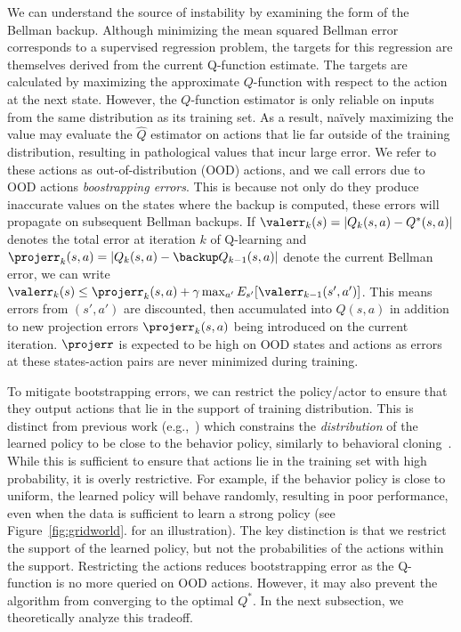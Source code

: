 We can understand the source of instability by examining the form of the Bellman backup. Although minimizing the mean squared Bellman error corresponds to a supervised regression problem, the targets for this regression are themselves derived from the current Q-function estimate. The targets are calculated by maximizing the approximate $Q$-function with respect to the action at the next state. However, the $Q$-function estimator is only reliable on inputs from the same distribution as its training set. As a result, na\"{i}vely maximizing the value may evaluate the $\hat{Q}$ estimator on actions that lie far outside of the training distribution, resulting in pathological values that incur large error. We refer to these actions as out-of-distribution (OOD) actions, and we call errors due to OOD actions \textit{boostrapping errors}. This is because not only do they produce inaccurate values on the states where the backup is computed, these errors will propagate on subsequent Bellman backups. 
If $\valerr_k(s) = |Q_k(s,a) - Q^*(s,a)|$ denotes the total error at iteration $k$ of Q-learning and $\projerr_k(s, a) = |Q_k(s,a) - \backup Q_{k-1}(s,a)|$ denote the current Bellman error, we can write $\valerr_k(s) \le \projerr_k(s,a) + \gamma \max_{a'} E_{s'}[\valerr_{k-1}(s',a')]$. This means errors from $(s', a')$ are discounted, then accumulated into $Q(s,a)$ in addition to new projection errors $\projerr_k(s, a)$ being introduced on the current iteration. $\projerr$ is expected to be high on OOD states and actions
as errors at these states-action pairs are never minimized during training.

To mitigate bootstrapping errors, we can restrict the policy/actor to ensure that they output actions that lie in the support of training distribution. 
This is distinct from previous work (e.g.,~\citep{fujimoto2018off}) which constrains the \emph{distribution} of the learned policy to be close to the behavior policy, similarly to behavioral cloning~\cite{Schaal99isimitation}.
While this is sufficient to ensure that actions lie in the training set with high probability, it is overly restrictive. For example, if the behavior policy is close to uniform, the learned policy will behave randomly, resulting in poor performance, even when the data is sufficient to learn a strong policy (see Figure~\ref{fig:gridworld}.
for an illustration). The key distinction is that we restrict the support of the learned policy, but not the probabilities of the actions within the support.
Restricting the actions reduces bootstrapping error as the Q-function is no more queried on OOD actions. However, it may also prevent the algorithm from converging to the optimal $Q^*$. In the next subsection, we theoretically analyze this tradeoff.


